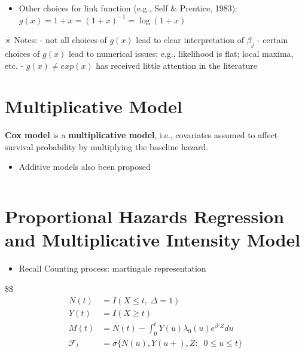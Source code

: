 \documentclass[
]{book}
\providecommand{\tightlist}{%
  \setlength{\itemsep}{0pt}\setlength{\parskip}{0pt}}
\theoremstyle{definition}
\theoremstyle{definition}
\theoremstyle{definition}
\theoremstyle{definition}
\theoremstyle{remark}
\begin{document}
\begin{itemize}
\tightlist
\item
  Other choices for link function (e.g., Self \& Prentice, 1983):
  \(g(x) = 1+x = (1+x)^{-1} = \log(1+x)\)
\end{itemize}

※ Notes:
- not all choices of \(g(x)\) lead to clear interpretation of \(\beta_j\)
- certain choices of \(g(x)\) lead to numerical issues; e.g., likelihood is flat; local maxima, etc.
- \(g(x) \not = exp(x)\) has received little attention in the literature

\hypertarget{multiplicative-model}{%
\section{Multiplicative Model}\label{multiplicative-model}}

\textbf{Cox model} is a \textbf{multiplicative model}, i.e., covariates assumed to affect survival probability by multiplying the baseline hazard.

\begin{itemize}
\tightlist
\item
  Additive models also been proposed
\end{itemize}

\[
\]

\hypertarget{proportional-hazards-regression-and-multiplicative-intensity-model}{%
\section{Proportional Hazards Regression and Multiplicative Intensity Model}\label{proportional-hazards-regression-and-multiplicative-intensity-model}}

\begin{itemize}
\tightlist
\item
  Recall Counting process: martingale representation
\end{itemize}

\$\$
\begin{align}

N(t) &= I(X\le t , \; \Delta = 1)
\\
Y(t) &= I(X \ge t)
\\
M(t) &= N(t) - \int_0^t Y(u)\lambda_0(u) e^{\beta ' Z } du \tag{1}
\\
\mathcal F_t &= \sigma \Big \{ N(u) , Y(u+) , Z: \; \; 0 \le u \le t \Big \}



\end{align}
\end{document}
